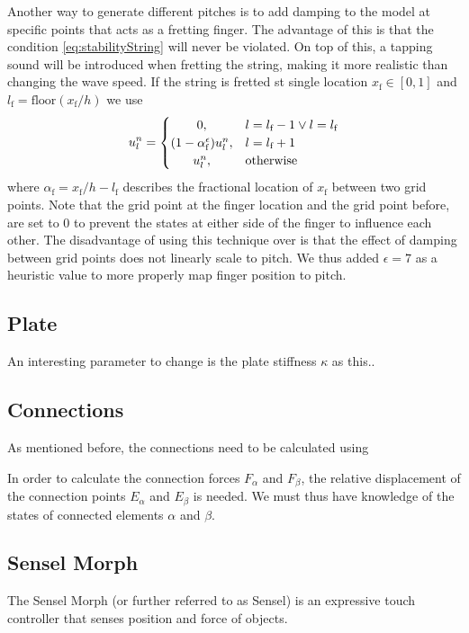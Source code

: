 \documentclass{article}
\begin{document}
Another way to generate different pitches is to add damping to the model at specific points that acts as a fretting finger. The advantage of this is that the condition \eqref{eq:stabilityString} will never be violated. On top of this, a tapping sound will be introduced when fretting the string, making it more realistic than changing the wave speed. If the string is fretted st single location $x_\text{f} \in [0, 1]$ and $l_\text{f} = \text{floor}(x_\text{f}/h)$ we use
\begin{equation}
u_l^n = 
    \begin{cases}
        \hfil 0, & l = l_\text{f} - 1 \vee l = l_\text{f}\\
        \hfil (1-\alpha_\text{f}^\epsilon) u_l^n, & l = l_\text{f} + 1\\
        \hfil u_l^n, & \text{otherwise}
    \end{cases}
\end{equation}
where $\alpha_\text{f} = x_\text{f}/h - l_\text{f}$ describes the fractional location of $x_\text{f}$ between two grid points. Note that the grid point at the finger location and the grid point before, are set to 0 to prevent the states at either side of the finger to influence each other. The disadvantage of using this technique over is that the effect of damping between grid points does not linearly scale to pitch. We thus added $\epsilon = 7$ as a heuristic value to more properly map finger position to pitch.

\subsection{Plate}
An interesting parameter to change is the plate stiffness $\kappa$ as this..

\subsection{Connections}
As mentioned before, the connections need to be calculated using 

In order to calculate the connection forces $F_\alpha$ and $F_\beta$, the relative displacement of the connection points $E_\alpha$ and $E_\beta$ is needed. We must thus have knowledge of the states of connected elements $\alpha$ and $\beta$. 

\subsection{Sensel Morph}
The Sensel Morph (or further referred to as Sensel) is an expressive touch controller that senses position and force of objects.
\end{document}
